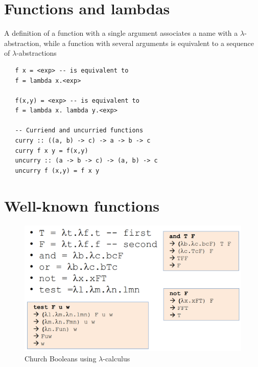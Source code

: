 \section{Functions and lambdas}
A definition of a function with a single argument
associates a name with a $\lambda$-abstraction,
while
a function with several arguments is equivalent to a
sequence of $\lambda$-abstractions
\begin{lstlisting}
   f x = <exp> -- is equivalent to
   f = lambda x.<exp>
   
   f(x,y) = <exp> -- is equivalent to
   f = lambda x. lambda y.<exp>

   -- Curriend and uncurried functions
   curry :: ((a, b) -> c) -> a -> b -> c
   curry f x y = f(x,y)
   uncurry :: (a -> b -> c) -> (a, b) -> c
   uncurry f (x,y) = f x y
\end{lstlisting}

\section{Well-known functions}
\begin{figure}[htbp]
   \centering
   \includegraphics{images/lambda_booleans.png}
   \caption{Church Booleans using $\lambda$-calculus}
   \label{fig:lambda_booleans}
\end{figure}

